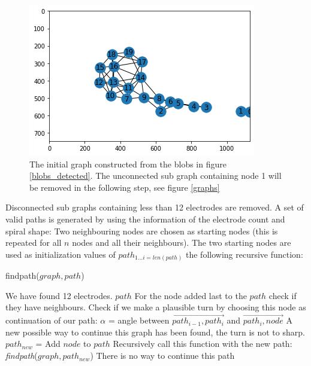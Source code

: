 \documentclass[a4paper, 11pt]{article}
\begin{document}
\begin{enumerate}
\begin{figure}[ht]
	\centering
  \includegraphics[width=.5\textwidth]{network_raw.png}
	\caption{The initial graph constructed from the blobs in figure \ref{blobs_detected}. The unconnected sub graph containing node 1 will be removed in the following step, see figure \ref{graphs}}
	\label{network_raw}
\end{figure}

Disconnected sub graphs containing less than 12 electrodes are removed.
A set of valid paths is generated by using the information of the electrode count and spiral shape: Two neighbouring nodes are chosen as starting nodes (this is repeated for all $n$ nodes and all their neighbours). The two starting nodes are used as initialization values of $path_{1...i = len(path)} $ the following recursive function:

\begin{algorithm}[H]
	\caption{findpath($graph,path$)} 
	
	\begin{algorithmic}[1]
			 \State We have found 12 electrodes.
		\Return $path$
		\EndIf
		\State For the node added last to the $path$ check if they have neighbours.
				\State Check if we make a plausible turn by choosing this node as continuation of our path:
				\State $\alpha$ = angle between $\overrightarrow{path_{i-1}, path_i}$ and $\overrightarrow{path_i, node}$
					\State A new possible way to continue this graph has been found, the turn is not to sharp.
					\State $path_{new}$ = Add $node$ to $path$
					\State Recursively call this function with the new path:
					\State \emph{findpath}($graph,path_{new}$)
				\EndIf
		\EndFor
			\State There is no way to continue this path
			\Return
		\EndIf
		
	\end{algorithmic} 
\end{algorithm}


\end{enumerate}
\end{document}

